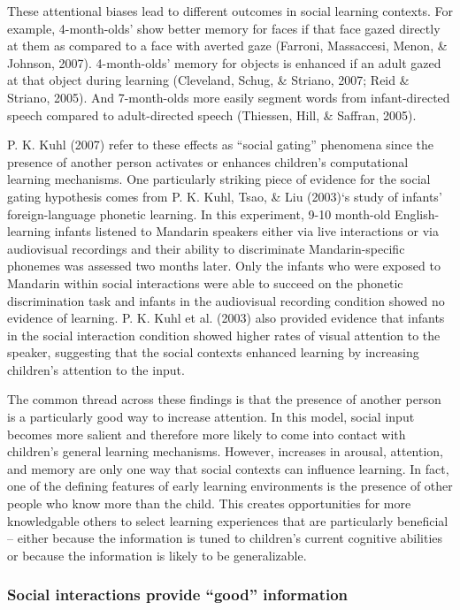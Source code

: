 \documentclass[a4paper,man,apacite,floatsintext]{apa6}
\begin{document}
These attentional biases lead to different outcomes in social learning
contexts. For example, 4-month-olds' show better memory for faces if
that face gazed directly at them as compared to a face with averted gaze
(Farroni, Massaccesi, Menon, \& Johnson, 2007). 4-month-olds' memory for
objects is enhanced if an adult gazed at that object during learning
(Cleveland, Schug, \& Striano, 2007; Reid \& Striano, 2005). And
7-month-olds more easily segment words from infant-directed speech
compared to adult-directed speech (Thiessen, Hill, \& Saffran, 2005).

P. K. Kuhl (2007) refer to these effects as ``social gating'' phenomena
since the presence of another person activates or enhances children's
computational learning mechanisms. One particularly striking piece of
evidence for the social gating hypothesis comes from P. K. Kuhl, Tsao,
\& Liu (2003)`s study of infants' foreign-language phonetic learning. In
this experiment, 9-10 month-old English-learning infants listened to
Mandarin speakers either via live interactions or via audiovisual
recordings and their ability to discriminate Mandarin-specific phonemes
was assessed two months later. Only the infants who were exposed to
Mandarin within social interactions were able to succeed on the phonetic
discrimination task and infants in the audiovisual recording condition
showed no evidence of learning. P. K. Kuhl et al. (2003) also provided
evidence that infants in the social interaction condition showed higher
rates of visual attention to the speaker, suggesting that the social
contexts enhanced learning by increasing children's attention to the
input.

The common thread across these findings is that the presence of another
person is a particularly good way to increase attention. In this model,
social input becomes more salient and therefore more likely to come into
contact with children's general learning mechanisms. However, increases
in arousal, attention, and memory are only one way that social contexts
can influence learning. In fact, one of the defining features of early
learning environments is the presence of other people who know more than
the child. This creates opportunities for more knowledgable others to
select learning experiences that are particularly beneficial -- either
because the information is tuned to children's current cognitive
abilities or because the information is likely to be generalizable.

\subsubsection{\texorpdfstring{Social interactions provide ``good''
information}{Social interactions provide good information}}\label{social-interactions-provide-good-information}
\end{document}
